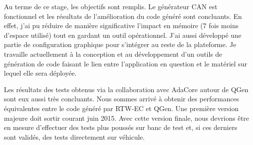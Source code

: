 Au terme de ce stage, les objectifs sont remplis. Le générateur CAN est
fonctionnel et les résultats de l'amélioration du code généré sont concluants.
En effet, j'ai pu réduire de manière significative l'impact en mémoire (7 fois
moins d'espace utilisé) tout en gardant un outil opérationnel. J'ai aussi
développé une partie de configuration graphique pour s'intégrer au reste de la
plateforme. Je travaille actuellement à la conception et au développement d'un
outils de génération de code faisant le lien entre l'application en question et
le matériel sur lequel elle sera déployée.

Les résultats des tests obtenus via la collaboration avec AdaCore autour de QGen
sont eux aussi très concluants. Nous sommes arrivé à obtenir des performances
équivalentes entre le code généré par RTW-EC\up{\circledR} et QGen. Une première
version majeure doit sortir courant juin 2015. Avec cette version finale, nous
devrions être en mesure d'effectuer des tests plus poussés sur banc de test et,
si ces derniers sont validés, des tests directement sur véhicule.



